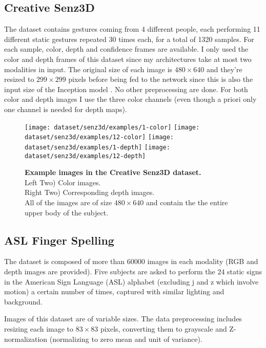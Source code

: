 \subsection{Creative Senz3D}

The dataset contains gestures coming from 4 different people, each
performing 11 different static gestures repeated 30 times each,
for a total of 1320 samples.
For each sample, color, depth and confidence frames are available.
I only used the color and depth frames of this dataset since my
architectures take at most two modalities in input. The original
size of each image is $480 \times 640$ and they're resized to
$299 \times 299$ pixels before being fed to the network since this
is also the input size of the Inception model \cite{C. Szegedy 2017}.
No other preprocessing are done. For both color and depth images I use
the three color channels (even though a priori only one channel is needed
for depth maps).

\begin{figure}[H]
  \centering
  \hfill
  \texttt{[image: dataset/senz3d/examples/1-color]}
  \hfill
  \texttt{[image: dataset/senz3d/examples/12-color]}
  \hfill
  \texttt{[image: dataset/senz3d/examples/1-depth]}
  \hfill
  \texttt{[image: dataset/senz3d/examples/12-depth]}
  \caption{%
    \textbf{Example images in the Creative Senz3D dataset.}\\[0.1em]
    Left Two) Color images.\\[0.1em]
    Right Two) Corresponding depth images.\\[0.1em]
    All of the images are of size $480 \times 640$ and contain the
      the entire upper body of the subject.}
  \label{fig:senz3d_exs}
\end{figure}

\subsection{ASL Finger Spelling}

The dataset is composed of more than 60000 images in each modality
(RGB and depth images are provided).
Five subjects are asked to perform the 24 static signs in
the American Sign Language (ASL) alphabet (excluding j and z which involve
motion) a certain number of times, captured with similar lighting
and background.

Images of this dataset are of variable sizes. The data preprocessing
includes resizing each image to $83 \times 83$ pixels,
converting them to grayscale and Z-normalization (normalizing to zero mean
and unit of variance).

